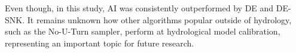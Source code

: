 Even though, in this study, AI was consistently outperformed by DE and DE-SNK. It remains unknown how other algorithms popular outside of hydrology, such as the No-U-Turn sampler, perform at hydrological model calibration, representing an important topic for future research.  








